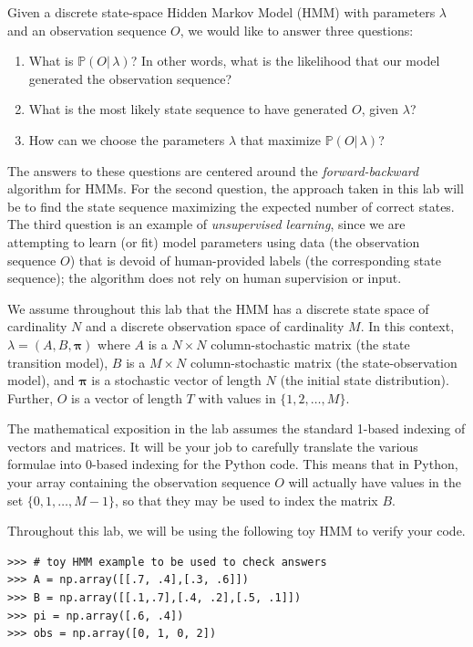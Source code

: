 \label{lab:hmm}

Given a discrete state-space Hidden Markov Model (HMM) with parameters $\lambda$ and an observation sequence $O$, we would like to answer three questions:
\begin{enumerate}
 \item What is $\mathbb{P}(O |\, \lambda)$? In other words, what is the likelihood that our model generated the observation sequence?
 \item What is the most likely state sequence to have generated $O$, given $\lambda$?
 \item How can we choose the parameters $\lambda$ that maximize $\mathbb{P}(O | \, \lambda)$?
\end{enumerate}
The answers to these questions are centered around the \emph{forward-backward} algorithm for HMMs.
For the second question, the approach taken in this lab will be to find the state sequence maximizing the expected number of correct states.
The third question is an example of \emph{unsupervised learning}, since we are attempting to learn (or fit) model parameters using data (the observation sequence $O$) that is devoid
of human-provided labels (the corresponding state sequence); the algorithm does not rely on human supervision or input.

We assume throughout this lab that the HMM has a discrete state space of cardinality $N$ and a discrete observation space of cardinality $M$.
In this context, $\lambda = \left( A, B, \mathbf{\pi} \right)$ where $A$ is a $N \times N$  column-stochastic matrix (the state transition model), $B$ is a $M \times N$ column-stochastic matrix (the
state-observation model), and $\mathbf{\pi}$ is a stochastic vector of length $N$ (the initial state distribution).
Further, $O$ is a vector of length $T$ with values in $\{1,2,\ldots,M\}$.

\begin{warn}
The mathematical exposition in the lab assumes the standard 1-based indexing of vectors and matrices.
It will be your job to carefully translate the various formulae into 0-based indexing for the Python code.
This means that in Python, your array containing the observation sequence $O$ will actually have values
in the set $\{0,1,\ldots,M-1\}$, so that they may be used to index the matrix $B$.
\end{warn}

Throughout this lab, we will be using the following toy HMM to verify your code.
\begin{lstlisting}
>>> # toy HMM example to be used to check answers
>>> A = np.array([[.7, .4],[.3, .6]])
>>> B = np.array([[.1,.7],[.4, .2],[.5, .1]])
>>> pi = np.array([.6, .4])
>>> obs = np.array([0, 1, 0, 2])
\end{lstlisting}

